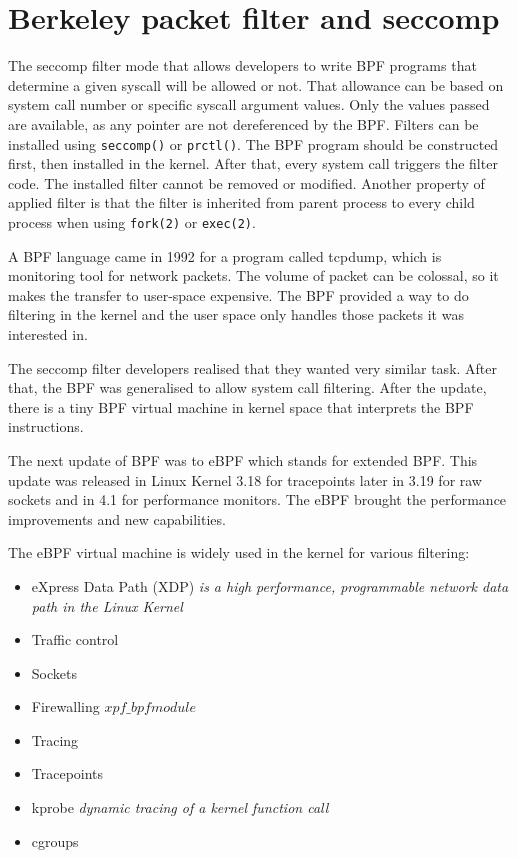 \section{Berkeley packet filter and seccomp}
The seccomp filter mode that allows developers to write BPF programs that determine a given syscall will be allowed or not.
That allowance can be based on system call number or specific syscall argument values.
Only the values passed are available, as any pointer are not dereferenced by the BPF.
Filters can be installed using \texttt{seccomp()} or \texttt{prctl()}.
The BPF program should be constructed first, then installed in the kernel.
After that, every system call triggers the filter code.
The installed filter cannot be removed or modified.
Another property of applied filter is that the filter is inherited from parent process to every child process when using \texttt{fork(2)} or \texttt{exec(2)}.

A BPF language came in 1992 for a program called tcpdump, which is monitoring tool for network packets.
The volume of packet can be colossal, so it makes the transfer to user-space expensive.
The BPF provided a way to do filtering in the kernel and the user space only handles those packets it was interested in.

The seccomp filter developers realised that they wanted very similar task.
After that, the BPF was generalised to allow system call filtering.
After the update, there is a tiny BPF virtual machine in kernel space that interprets the BPF instructions.

The next update of BPF was to eBPF which stands for extended BPF.
This update was released in Linux Kernel 3.18 for tracepoints later in 3.19 for raw sockets and in 4.1 for performance monitors.
The eBPF brought the performance improvements and new capabilities.

The eBPF virtual machine is widely used in the kernel for various filtering:
\begin{itemize}
	\item eXpress Data Path (XDP) \textit{is a high performance, programmable network data path in the Linux Kernel}
    \item Traffic control
    \item Sockets
    \item Firewalling \textit{\(xpf\_bpf module\)}
    \item Tracing
    \item Tracepoints
    \item kprobe \textit{dynamic tracing of a kernel function call}
    \item cgroups
\end{itemize}


